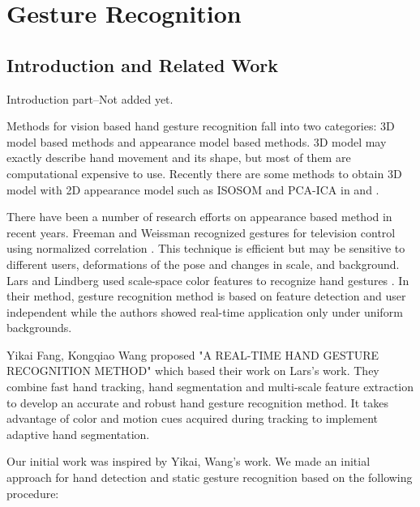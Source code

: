 \chapter{Gesture Recognition}
\section{Introduction and Related Work}
Introduction part--Not added yet.
\bigskip

Methods for vision based hand gesture recognition fall into two categories: 3D model based methods and appearance model based methods. 3D model may exactly describe hand movement and its shape, but most of them are computational expensive to use. Recently there are some methods to obtain 3D model with 2D appearance model such as ISOSOM and PCA-ICA in \cite{relatedsg1} and \cite{relatedsg2}.
\bigskip

There have been a number of research efforts on appearance based method in recent years. Freeman and Weissman recognized gestures for television control using normalized correlation \cite{relatedsg3}. This technique is efficient but may be sensitive to different users, deformations of the pose and changes in scale, and background. Lars and Lindberg used scale-space color features to recognize hand gestures \cite{relatedsg4}. In their method, gesture recognition method is based on feature detection and user independent while the authors showed real-time application only under uniform backgrounds.
\bigskip

Yikai Fang, Kongqiao Wang proposed "A REAL-TIME HAND GESTURE RECOGNITION METHOD" \cite{relatedsg5} which based their work on Lars's work. They combine fast hand tracking, hand segmentation and multi-scale feature extraction to develop an accurate and robust hand gesture recognition method. It takes advantage of color and motion cues acquired during tracking to implement adaptive hand segmentation.
\bigskip

Our initial work was inspired by Yikai, Wang's work. We made an initial approach for hand detection and static gesture recognition based on the following procedure:\bigskip


